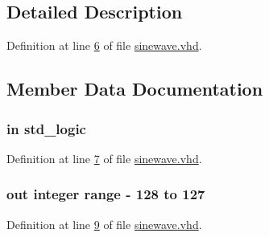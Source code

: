 \subsection{Detailed Description}


Definition at line \hyperlink{sinewave_8vhd_source_l00006}{6} of file \hyperlink{sinewave_8vhd_source}{sinewave.\+vhd}.



\subsection{Member Data Documentation}
\hypertarget{classsinewave_a4a4609c199d30b3adebbeb3a01276ec5}{}
\subsubsection[{clk}]{ {\bfseries \textcolor{keywordflow}{in}\textcolor{vhdlchar}{ }} {\bfseries \textcolor{comment}{std\+\_\+logic}\textcolor{vhdlchar}{ }} \hspace{0.3cm}{\ttfamily [Port]}}\label{classsinewave_a4a4609c199d30b3adebbeb3a01276ec5}


Definition at line \hyperlink{sinewave_8vhd_source_l00007}{7} of file \hyperlink{sinewave_8vhd_source}{sinewave.\+vhd}.

\hypertarget{classsinewave_a6f923bb55dbbef4e48f6ae28e0588faf}{}
\subsubsection[{dataout}]{ {\bfseries \textcolor{keywordflow}{out}\textcolor{vhdlchar}{ }} {\bfseries \textcolor{comment}{integer}\textcolor{vhdlchar}{ }\textcolor{vhdlchar}{ }\textcolor{vhdlchar}{ }\textcolor{keywordflow}{range}\textcolor{vhdlchar}{ }\textcolor{vhdlchar}{-\/}\textcolor{vhdlchar}{ } \textcolor{vhdldigit}{128} \textcolor{vhdlchar}{ }\textcolor{keywordflow}{to}\textcolor{vhdlchar}{ }\textcolor{vhdlchar}{ } \textcolor{vhdldigit}{127} \textcolor{vhdlchar}{ }} \hspace{0.3cm}{\ttfamily [Port]}}\label{classsinewave_a6f923bb55dbbef4e48f6ae28e0588faf}


Definition at line \hyperlink{sinewave_8vhd_source_l00009}{9} of file \hyperlink{sinewave_8vhd_source}{sinewave.\+vhd}.

